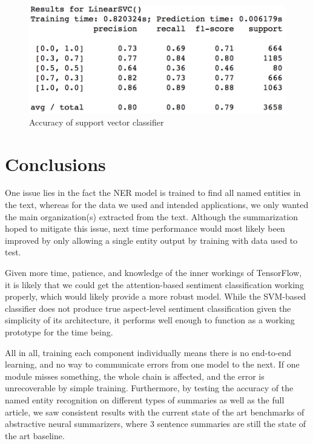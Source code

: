 \documentclass[12pt,a4paper]{article}
\begin{document}
\begin{figure}[H]
  \centering
  \includegraphics[scale=0.7]{results_svc.png}
  \caption{Accuracy of support vector classifier}
  \label{fig:network_performance}
\end{figure}


\section{\label{Conclusions}Conclusions}
One issue lies in the fact the NER model is trained to find all named entities in the text, whereas for the data we used and intended applications, we only wanted the main organization(s) extracted from the text. Although the summarization hoped to mitigate this issue, next time performance would most likely been improved by only allowing a single entity output by training with data used to test. 

Given more time, patience, and knowledge of the inner workings of TensorFlow, it is likely that we could get the attention-based sentiment classification working properly, which would likely provide a more robust model. While the SVM-based classifier does not produce true aspect-level sentiment classification given the simplicity of its architecture, it performs well enough to function as a working prototype for the time being.

All in all, training each component individually means there is no end-to-end learning, and no way to communicate errors from one model to the next. If one module misses something, the whole chain is affected, and the error is unrecoverable by simple training. Furthermore, by testing the accuracy of the named entity recognition on different types of summaries as well as the full article, we saw consistent results with the current state of the art benchmarks of abstractive neural summarizers, where 3 sentence summaries are still the state of the art baseline.









%
%
\end{document}
